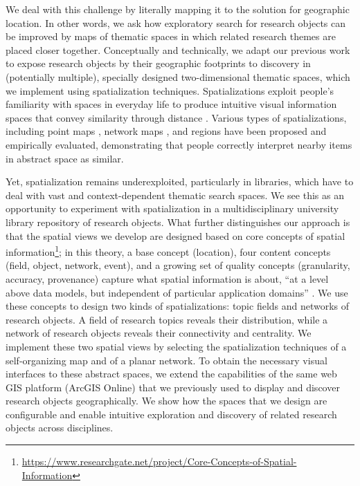 \documentclass[a4paper,UKenglish]{lipics-v2018}
\begin{document}
We deal with this challenge by literally mapping it to the solution for geographic location. In other words, we ask how exploratory search for research objects can be improved by maps of thematic spaces in which related research themes are placed closer together. Conceptually and technically, we adapt our previous work to expose research objects by their geographic footprints \cite{Lafia2016h} to discovery in (potentially multiple), specially designed two-dimensional thematic spaces, which we implement using spatialization techniques. Spatializations exploit people’s familiarity with spaces in everyday life to produce intuitive visual information spaces that convey similarity through distance \cite{Kuhn1996}. Various types of spatializations, including point maps \cite{Montello2003d}, network maps \cite{Fabrikant2004a}, and regions \cite{Fabrikant2006a} have been proposed and empirically evaluated, demonstrating that people correctly interpret nearby items in abstract space as similar.

Yet, spatialization remains underexploited, particularly in libraries, which have to deal with vast and context-dependent thematic search spaces. We see this as an opportunity to experiment with spatialization in a multidisciplinary university library repository of research objects. What further distinguishes our approach is that the spatial views we develop are designed based on core concepts of spatial information\footnote{\url{https://www.researchgate.net/project/Core-Concepts-of-Spatial-Information}}; in this theory, a base concept (location), four content concepts (field, object, network, event), and a growing set of quality concepts (granularity, accuracy, provenance) capture what spatial information is about, “at a level above data models, but independent of particular application domains” \cite{Kuhn2012e}. We use these concepts to design two kinds of spatializations: topic fields and networks of research objects. A field of research topics reveals their  distribution, while a network of research objects reveals their connectivity and centrality. We implement these two spatial views by selecting the spatialization techniques of a self-organizing map \cite{Kohonen1995a} and of a planar network. To obtain the necessary visual interfaces to these abstract spaces, we extend the capabilities of the same web GIS platform (ArcGIS Online) that we previously used to display and discover research objects geographically. We show how the spaces that we design are configurable and enable intuitive exploration and discovery of related research objects across disciplines. 
\end{document}
